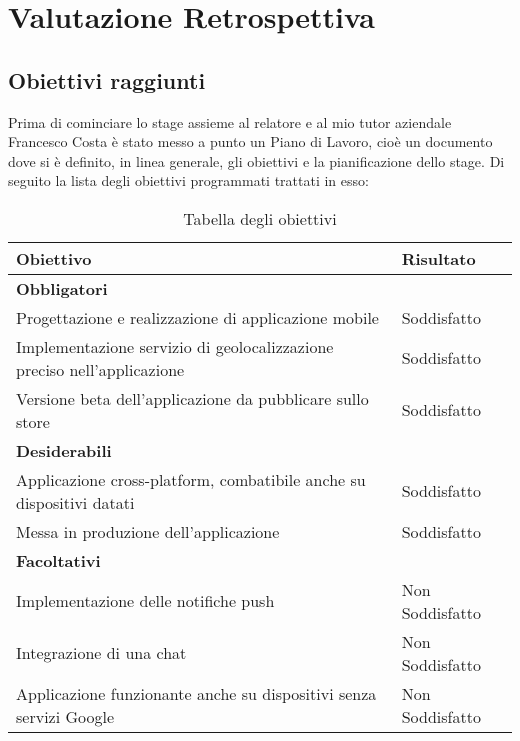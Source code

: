 
\chapter{Valutazione Retrospettiva}
\label{cap:valutazione-retrospettiva}


\section{Obiettivi raggiunti}

Prima di cominciare lo stage assieme al relatore \myProf e al mio tutor aziendale Francesco Costa è stato messo a punto
un Piano di Lavoro, cioè un documento dove si è definito, in linea generale, gli obiettivi e la pianificazione dello
stage. Di seguito la lista degli obiettivi programmati trattati in esso: 

\renewcommand{\arraystretch}{2}
\begin{longtable}{|p{10cm}|p{4cm}|}%
  \caption{Tabella degli obiettivi} 
  \label{tab:obiettivi} \\
    \hline
    \textbf{Obiettivo} & \textbf{Risultato} \\
    \hline
    \endhead
    \multicolumn{2}{|l|}{\textbf{Obbligatori}} \\ \hline
    Progettazione e realizzazione di applicazione mobile                      & Soddisfatto \\ \hline
    Implementazione servizio di geolocalizzazione preciso nell’applicazione   & Soddisfatto \\ \hline
    Versione beta dell'applicazione da pubblicare sullo store                 & Soddisfatto \\ \hline
    \multicolumn{2}{|l|}{\textbf{Desiderabili}} \\ \hline
    Applicazione cross-platform, combatibile anche su dispositivi datati      & Soddisfatto \\ \hline
    Messa in produzione dell’applicazione                                     & Soddisfatto \\ \hline
    \multicolumn{2}{|l|}{\textbf{Facoltativi}} \\ \hline
    Implementazione delle notifiche push                                      & Non Soddisfatto \\ \hline
    Integrazione di una chat                                                  & Non Soddisfatto \\ \hline
    Applicazione funzionante anche su dispositivi senza servizi Google        & Non Soddisfatto \\ \hline
\end{longtable}%

